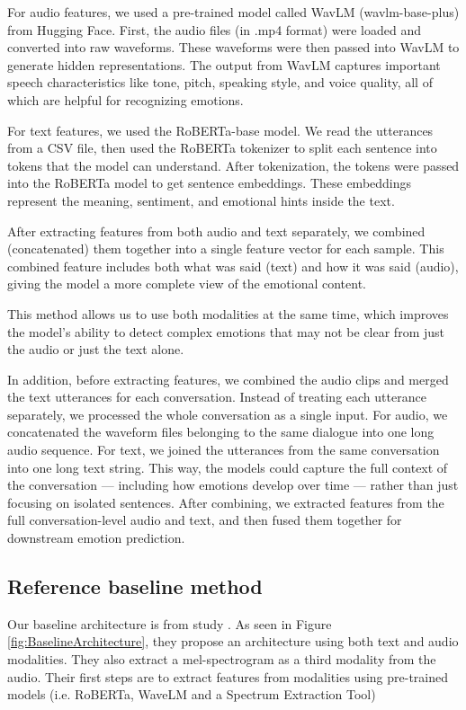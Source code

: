 \documentclass{article}
\begin{document}
For audio features, we used a pre-trained model called WavLM (wavlm-base-plus) from Hugging Face. First, the audio files (in .mp4 format) were loaded and converted into raw waveforms. These waveforms were then passed into WavLM to generate hidden representations. The output from WavLM captures important speech characteristics like tone, pitch, speaking style, and voice quality, all of which are helpful for recognizing emotions.

For text features, we used the RoBERTa-base model. We read the utterances from a CSV file, then used the RoBERTa tokenizer to split each sentence into tokens that the model can understand. After tokenization, the tokens were passed into the RoBERTa model to get sentence embeddings. These embeddings represent the meaning, sentiment, and emotional hints inside the text.

After extracting features from both audio and text separately, we combined (concatenated) them together into a single feature vector for each sample. This combined feature includes both what was said (text) and how it was said (audio), giving the model a more complete view of the emotional content.

This method allows us to use both modalities at the same time, which improves the model's ability to detect complex emotions that may not be clear from just the audio or just the text alone.

In addition, before extracting features, we combined the audio clips and merged the text utterances for each conversation. Instead of treating each utterance separately, we processed the whole conversation as a single input. For audio, we concatenated the waveform files belonging to the same dialogue into one long audio sequence. For text, we joined the utterances from the same conversation into one long text string. This way, the models could capture the full context of the conversation — including how emotions develop over time — rather than just focusing on isolated sentences. After combining, we extracted features from the full conversation-level audio and text, and then fused them together for downstream emotion prediction.

\subsection{Reference baseline method}

Our baseline architecture is from study \cite{ERCFusionModel}.
As seen in Figure \ref{fig:BaselineArchitecture}, they propose an architecture using both text and audio modalities. They also extract a mel-spectrogram as a third modality from the audio. Their first steps are to extract features from modalities using pre-trained models (i.e. RoBERTa, WaveLM and a Spectrum Extraction Tool)
\end{document}
